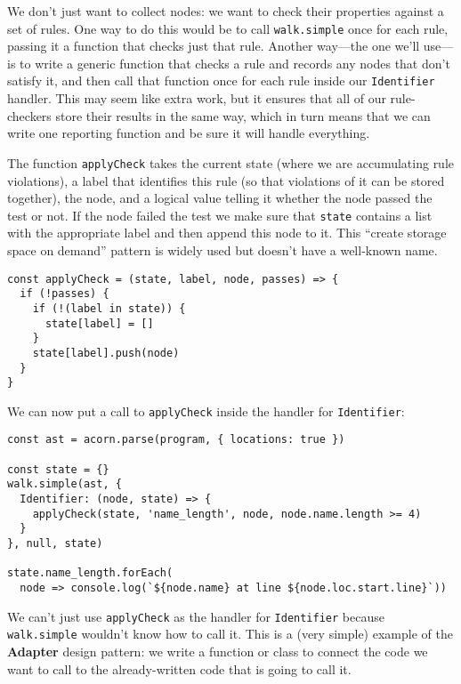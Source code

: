 \documentclass[krantzl]{krantz}
\newcommand{\glossref}[1]{\textbf{#1}}
\begin{document}
We don’t just want to collect nodes:
we want to check their properties against a set of rules.
One way to do this would be to call \texttt{walk.simple} once for each rule,
passing it a function that checks just that rule.
Another way—the one we’ll use—is to write a generic function
that checks a rule and records any nodes that don’t satisfy it,
and then call that function once for each rule inside our \texttt{Identifier} handler.
This may seem like extra work,
but it ensures that all of our rule-checkers store their results in the same way,
which in turn means that we can write one reporting function
and be sure it will handle everything.


The function  \texttt{applyCheck} takes the current state (where we are accumulating rule violations),
a label that identifies this rule (so that violations of it can be stored together),
the node,
and a logical value telling it whether the node passed the test or not.
If the node failed the test
we make sure that \texttt{state} contains a list with the appropriate label
and then append this node to it.
This “create storage space on demand” pattern
is widely used but doesn’t have a well-known name.


\begin{lstlisting}[frame=tblr]
const applyCheck = (state, label, node, passes) => {
  if (!passes) {
    if (!(label in state)) {
      state[label] = []
    }
    state[label].push(node)
  }
}
\end{lstlisting}



We can now put a call to \texttt{applyCheck} inside the handler for \texttt{Identifier}:


\begin{lstlisting}[frame=tblr]
const ast = acorn.parse(program, { locations: true })

const state = {}
walk.simple(ast, {
  Identifier: (node, state) => {
    applyCheck(state, 'name_length', node, node.name.length >= 4)
  }
}, null, state)

state.name_length.forEach(
  node => console.log(`${node.name} at line ${node.loc.start.line}`))
\end{lstlisting}



\noindent We can’t just use \texttt{applyCheck} as the handler for \texttt{Identifier}
because \texttt{walk.simple} wouldn’t know how to call it.
This is a (very simple) example of the \glossref{Adapter} design pattern:
we write a function or class to connect the code we want to call
to the already-written code that is going to call it.
\end{document}
